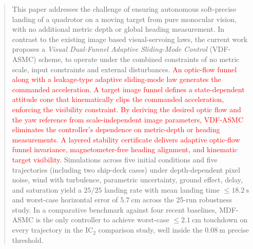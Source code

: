 \documentclass{IEEEtaes}
\begin{document}
\begin{abstract}This paper addresses the challenge of ensuring autonomous soft-precise landing of a quadrotor on a moving target from pure monocular vision, with no additional metric depth or global heading measurement. In contrast to the existing image based visual-servoing laws, the current work proposes a \emph{Visual Dual-Funnel Adaptive Sliding-Mode Control} (VDF-ASMC) scheme, to operate under the combined constraints of no metric scale, input constraints and external disturbances. \textcolor{red}{ An optic-flow funnel along with a leakage-type adaptive sliding-mode law generates the commanded acceleration. A target image funnel defines a state-dependent attitude cone that kinematically clips the commanded acceleration, enforcing the visibility constraint. By deriving the desired optic flow and the yaw reference from scale-independent image parameters, VDF-ASMC eliminates the controller's dependence on metric-depth or heading measurements. A layered stability certificate delivers adaptive optic-flow funnel invariance, magnetometer-free heading alignment, and kinematic target visibility.} Simulations across five initial conditions and five trajectories (including two ship-deck cases) under depth-dependent pixel noise, wind with turbulence, parametric uncertainty, ground effect, delay, and saturation yield a $25/25$ landing rate with mean landing time $\le 18.2~\text{s}$ and worst-case horizontal error of $5.7~\text{cm}$ across the 25-run robustness study. In a comparative benchmark against four recent baselines, MDF-ASMC is the only controller to achieve worst-case $\le 2.1~\text{cm}$ touchdown on every trajectory in the IC$_2$ comparison study, well inside the $0.08~\text{m}$ precise threshold.
\end{abstract}
\end{document}
